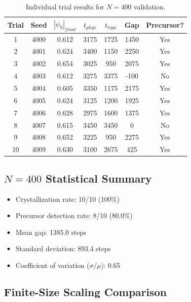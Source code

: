 \documentclass[11pt]{article}
\begin{document}
\begin{table}[h]
\centering
\caption{Individual trial results for $N=400$ validation.}
\label{tab:n400trials}
\begin{tabular}{ccccccc}
\toprule
\textbf{Trial} & \textbf{Seed} & \textbf{$|\psi_6|_{final}$} & \textbf{$t_{phys}$} & \textbf{$t_{topo}$} & \textbf{Gap} & \textbf{Precursor?} \\
\midrule
1 & 4000 & 0.612 & 3175 & 1725 & 1450 & Yes \\
2 & 4001 & 0.624 & 3400 & 1150 & 2250 & Yes \\
3 & 4002 & 0.654 & 3025 & 950 & 2075 & Yes \\
4 & 4003 & 0.612 & 3275 & 3375 & -100 & No \\
5 & 4004 & 0.605 & 3350 & 1175 & 2175 & Yes \\
6 & 4005 & 0.624 & 3125 & 1200 & 1925 & Yes \\
7 & 4006 & 0.628 & 2975 & 1600 & 1375 & Yes \\
8 & 4007 & 0.615 & 3450 & 3450 & 0 & No \\
9 & 4008 & 0.652 & 3225 & 950 & 2275 & Yes \\
10 & 4009 & 0.630 & 3100 & 2675 & 425 & Yes \\
\bottomrule
\end{tabular}
\end{table}

\subsection{$N=400$ Statistical Summary}

\begin{itemize}
    \item Crystallization rate: 10/10 (100\%)
    \item Precursor detection rate: 8/10 (80.0\%)
    \item Mean gap: 1385.0 steps
    \item Standard deviation: 893.4 steps
    \item Coefficient of variation ($\sigma/\mu$): 0.65
\end{itemize}

\subsection{Finite-Size Scaling Comparison}
\end{document}

